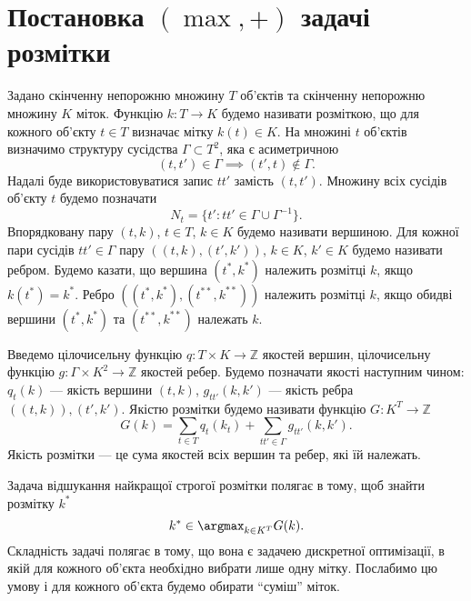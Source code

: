 \section{Постановка \((\max,+)\) задачі розмітки}

Задано скінченну непорожню множину $T$ об'єктів та скінченну
непорожню множину $K$ міток. Функцію $k:T\rightarrow K$ будемо
називати розміткою, що для кожного об'єкту $t\in T$ визначає мітку
$k(t)\in K$. На множині $t$ об'єктів визначимо структуру сусідства
$\Gamma \subset T^2$, яка є асиметричною
\begin{equation*}
    (t,t') \in \Gamma\implies (t',t) \notin \Gamma.
\end{equation*}
Надалі буде використовуватися запис $tt'$ замість $(t,t')$. Множину
всіх сусідів об'єкту $t$ будемо позначати
\begin{equation*}
      N_t = \{ t':tt'\in \Gamma \cup \Gamma^{-1}\}.
  \end{equation*}
Впорядковану пару $(t, k)$, $t \in T$, $k \in K$ будемо називати вершиною.
Для кожної пари сусідів $tt'\in\Gamma$ пару $((t,k),(t',k'))$, $k\in K$, $k'\in K$
будемо називати ребром. Будемо казати, що вершина  $(t^*, k^*)$ належить
розмітці $k$, якщо $k(t^*)=k^*$. Ребро $((t^*,k^*),(t^{**},k^{**}))$ належить
розмітці $k$, якщо обидві вершини $(t^*,k^*)$ та $(t^{**},k^{**})$ належать $k$.

Введемо цілочисельну функцію $q:T\times K\rightarrow\mathbb{Z}$ якостей вершин,
цілочисельну функцію $g:\Gamma\times K^2\rightarrow\mathbb{Z}$ якостей ребер. Будемо
позначати якості наступним чином: $q_t(k)$ --- якість вершини $(t,k)$,
$g_{tt'}(k,k')$ --- якість ребра $((t,k)),(t',k')$. Якістю розмітки будемо називати
функцію $G:K^T\rightarrow \mathbb{Z}$
\begin{equation*}
  G(k)=\sum_{t \in T} q_t(k_t) + \sum_{tt' \in \Gamma} g_{tt'}(k,k').
  \end{equation*}
Якість розмітки --- це сума якостей всіх вершин та ребер, які їй належать.

Задача відшукання найкращої строгої розмітки полягає в тому, щоб знайти
розмітку $k^*$
\begin{equation}
      k^* \in \argmax_{k\in K^T} G(k).
      \label{eqn:strict_labeling}
  \end{equation}
Складність задачі полягає в тому, що
вона є задачею дискретної оптимізації, в якій для кожного об'єкта необхідно
вибрати лише одну мітку. Послабимо цю умову і для кожного об'єкта будемо
обирати ``суміш'' міток.

